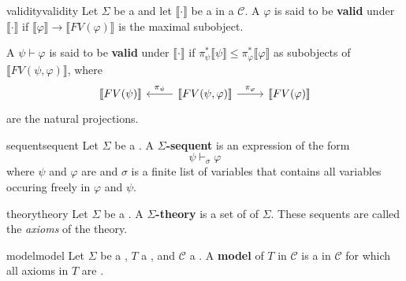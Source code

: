 \begin{topic}{validity}{validity}
    Let $\Sigma$ be a  and let $\llbracket \cdot \rrbracket$ be a  in a  $\mathcal{C}$.
    A  $\varphi$ is said to be \textbf{valid} under $\llbracket \cdot \rrbracket$ if $\llbracket \varphi \rrbracket \to \llbracket FV(\varphi) \rrbracket$ is the maximal subobject.

    A  $\psi \vdash \varphi$ is said to be \textbf{valid} under $\llbracket \cdot \rrbracket$ if $\pi_\psi^* \llbracket \psi \rrbracket \le \pi_\varphi^* \llbracket \varphi \rrbracket$ as subobjects of $\llbracket FV(\psi, \varphi) \rrbracket$, where
    \[ \svg \begin{tikzcd} \llbracket FV(\psi) \rrbracket & \arrow[swap]{l}{\pi_\psi} \llbracket FV(\psi, \varphi) \rrbracket \arrow{r}{\pi_\varphi} & \llbracket FV(\varphi) \rrbracket \end{tikzcd} \]
    are the natural projections.
\end{topic}

\begin{topic}{sequent}{sequent}
    Let $\Sigma$ be a . A \textbf{$\Sigma$-sequent} is an expression of the form
    \[ \psi \vdash_\sigma \varphi \]
    where $\psi$ and $\varphi$ are  and $\sigma$ is a finite list of variables that contains all variables occuring freely in $\varphi$ and $\psi$.
\end{topic}

\begin{topic}{theory}{theory}
    Let $\Sigma$ be a . A \textbf{$\Sigma$-theory} is a set of  of $\Sigma$. These sequents are called the \textit{axioms} of the theory.
\end{topic}

\begin{topic}{model}{model}
    Let $\Sigma$ be a , $T$ a , and $\mathcal{C}$ a .
    A \textbf{model} of $T$ in $\mathcal{C}$ is a  in $\mathcal{C}$ for which all axioms in $T$ are .
\end{topic}

